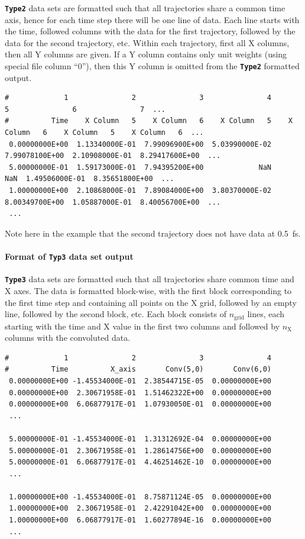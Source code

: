 \documentclass[a4paper,10pt,DIV=15,openany]{scrbook}
\newcommand{\ttt}[1]{\textbf{\texttt{#1}}}
\newenvironment{example}{
  \setlength{\OuterFrameSep}{3pt}
  \vspace{0mm}
  \definecolor{shadecolor}{HTML}{E4F4FF}
  \begin{shaded}
}{
  \end{shaded}
}
\begin{document}
\ttt{Type2} data sets are formatted such that all trajectories share a common time axis, hence for each time step there will be one line of data.
Each line starts with the time, followed columns with the data for the first trajectory, followed by the data for the second trajectory, etc.
Within each trajectory, first all X columns, then all Y columns are given. If a Y column contains only unit weights (using special file column ``0''), then this Y column is omitted from the \ttt{Type2} formatted output.
\begin{example}
\footnotesize\begin{verbatim}
#             1               2               3               4               5               6               7  ...
#          Time    X Column   5    X Column   6    X Column   5    X Column   6    X Column   5    X Column   6  ...
 0.00000000E+00  1.13340000E-01  7.99096900E+00  5.03990000E-02  7.99078100E+00  2.10908000E-01  8.29417600E+00  ...
 5.00000000E-01  1.59173000E-01  7.94395200E+00             NaN             NaN  1.49506000E-01  8.35651800E+00  ...
 1.00000000E+00  2.10868000E-01  7.89084000E+00  3.80370000E-02  8.00349700E+00  1.05887000E-01  8.40056700E+00  ...
 ...
\end{verbatim}
\end{example}
Note here in the example that the second trajectory does not have data at 0.5~fs.

\paragraph{Format of \ttt{Typ3} data set output}

\ttt{Type3} data sets are formatted such that all trajectories share common time and X axes.
The data is formatted block-wise, with the first block corresponding to the first time step and containing all points on the X grid, followed by an empty line, followed by the second block, etc.
Each block consists of $n_\text{grid}$ lines, each starting with the time and X value in the first two columns and followed by $n_\text{X}$ columns with the convoluted data.
\begin{example}
\footnotesize\begin{verbatim}
#             1               2               3               4 
#          Time          X_axis       Conv(5,0)       Conv(6,0) 
 0.00000000E+00 -1.45534000E-01  2.38544715E-05  0.00000000E+00 
 0.00000000E+00  2.30671958E-01  1.51462322E+00  0.00000000E+00 
 0.00000000E+00  6.06877917E-01  1.07930050E-01  0.00000000E+00 
 ...

 5.00000000E-01 -1.45534000E-01  1.31312692E-04  0.00000000E+00 
 5.00000000E-01  2.30671958E-01  1.28614756E+00  0.00000000E+00 
 5.00000000E-01  6.06877917E-01  4.46251462E-10  0.00000000E+00 
 ...

 1.00000000E+00 -1.45534000E-01  8.75871124E-05  0.00000000E+00 
 1.00000000E+00  2.30671958E-01  2.42291042E+00  0.00000000E+00 
 1.00000000E+00  6.06877917E-01  1.60277894E-16  0.00000000E+00 
 ...
\end{verbatim}
\end{example}
\end{document}
